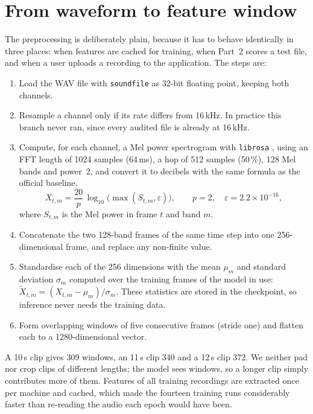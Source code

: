 \section{From waveform to feature window}
The preprocessing is deliberately plain, because it has to behave identically in three places: when features are cached for training, when Part~2 scores a test file, and when a user uploads a recording to the application. The steps are:
\begin{enumerate}
  \item Load the WAV file with \texttt{soundfile} as 32-bit floating point, keeping both channels.
  \item Resample a channel only if its rate differs from 16\,kHz. In practice this branch never ran, since every audited file is already at 16\,kHz.
  \item Compute, for each channel, a Mel power spectrogram with \texttt{librosa} \cite{librosa}, using an FFT length of 1024 samples (64\,ms), a hop of 512 samples (50\,\%), 128 Mel bands and power~2, and convert it to decibels with the same formula as the official baseline,
  \begin{equation}
    X_{t,m} = \frac{20}{p}\,\log_{10}\!\big(\max(S_{t,m},\varepsilon)\big), \qquad p = 2,\quad \varepsilon = 2.2\times 10^{-16},
    \label{eq:logmel}
  \end{equation}
  where $S_{t,m}$ is the Mel power in frame $t$ and band $m$.
  \item Concatenate the two 128-band frames of the same time step into one 256-dimensional frame, and replace any non-finite value.
  \item Standardise each of the 256 dimensions with the mean $\mu_m$ and standard deviation $\sigma_m$ computed over the training frames of the model in use: $\tilde X_{t,m} = (X_{t,m}-\mu_m)/\sigma_m$. These statistics are stored in the checkpoint, so inference never needs the training data.
  \item Form overlapping windows of five consecutive frames (stride one) and flatten each to a 1280-dimensional vector.
\end{enumerate}
A 10\,s clip gives 309 windows, an 11\,s clip 340 and a 12\,s clip 372. We neither pad nor crop clips of different lengths; the model sees windows, so a longer clip simply contributes more of them. Features of all training recordings are extracted once per machine and cached, which made the fourteen training runs considerably faster than re-reading the audio each epoch would have been.

